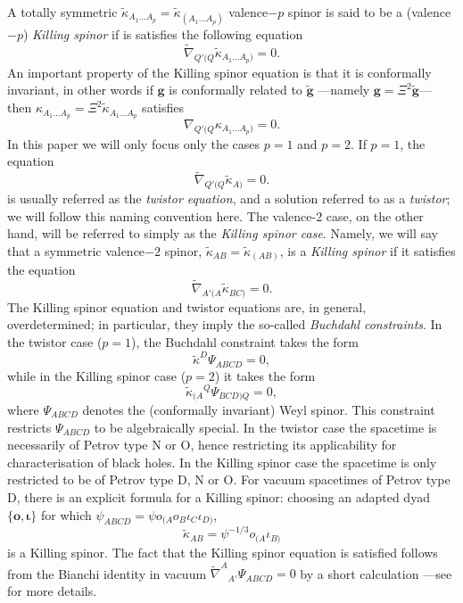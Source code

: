 \documentclass[10pt,a4paper]{article}
\theoremstyle{plain}
\def\bmg{{\bm g}}
\def\bmo{{\bm o}}
\begin{document}
A totally symmetric
$\tilde{\kappa}_{A_1...A_p}=\tilde{\kappa}_{(A_1...A_p)}$ valence$-p$
spinor is said to be a (valence$-p$) \emph{Killing spinor} if is
satisfies the following equation
\begin{equation}\label{qValenceKillingspinor}
\tilde{\nabla}_{Q'(Q}\tilde{\kappa}_{A_1...A_p)}=0.
\end{equation}
An important property of the Killing spinor equation is that it is
conformally invariant, in other words if $\bmg$ is conformally related
to $\tilde{\bmg}$ ---namely $\bmg=\Xi^2\tilde{\bmg}$--- then
${\kappa}_{A_1...A_p}=\Xi^2 \tilde{\kappa}_{A_1...A_p}$ satisfies
\[{\nabla}_{Q'(Q}{\kappa}_{A_1...A_p)}=0.\]
\medskip
\noindent In this paper we will only focus only the cases $p=1$ and
$p=2$.  If $p=1$, the equation
\begin{equation}\label{TwistorEq}
  \tilde{\nabla}_{Q'(Q}\tilde{\kappa}_{A)}=0.
\end{equation}
is usually referred as the \emph{twistor equation}, and a solution
referred to as a \emph{twistor}; we will follow this naming convention
here.  The valence-2 case, on the other hand, will be referred to
simply as the \emph{Killing spinor case}.  Namely, we will say that a
symmetric valence$-2$ spinor,
$\tilde{\kappa}_{AB}=\tilde{\kappa}_{(AB)}$, is a \textit{Killing
  spinor} if it satisfies the equation
\begin{equation}
\tilde{\nabla}_{A'(A}\tilde{\kappa}_{BC)}=0.
\end{equation}
The Killing spinor equation and twistor equations are, in general,
overdetermined; in particular, they imply the so-called
\textit{Buchdahl constraints}.  In the twistor case ($p=1$), the Buchdahl constraint takes
the form
\[
\tilde{\kappa}^D\Psi_{ABCD}=0,
\]
while in the Killing spinor case ($p=2$) it takes the form
\[
\tilde{\kappa}_{(A}{}^Q\Psi_{BCD)Q}=0,
\]
where $\Psi_{ABCD}$ denotes the (conformally invariant) Weyl spinor.
This constraint restricts $\Psi_{ABCD}$ to be algebraically special.
In the twistor case the spacetime is necessarily of Petrov type N or
O, hence restricting its applicability for characterisation of black
holes.  In the Killing spinor case the spacetime is only restricted to
be of Petrov type D, N or O.  For vacuum spacetimes of Petrov type D,
there is an explicit
formula for a Killing spinor: choosing an adapted dyad $\lbrace \bmo,
\bm\iota\rbrace$ for which $\psi_{ABCD}=\psi
o_{(A}o_{B}\iota_C\iota_{D)}$,
\[\tilde{\kappa}_{AB} = \psi^{-1/3}o_{(A}\iota_{B)}\]
is a Killing spinor. The fact that the Killing spinor equation is
satisfied follows from the Bianchi identity in vacuum
$\tilde{\nabla}^A{}_{A'}\Psi_{ABCD}=0$ by a short calculation ---see
\cite{PenRin84, WalkerPenrose70} for more details.
\medskip
\end{document}
